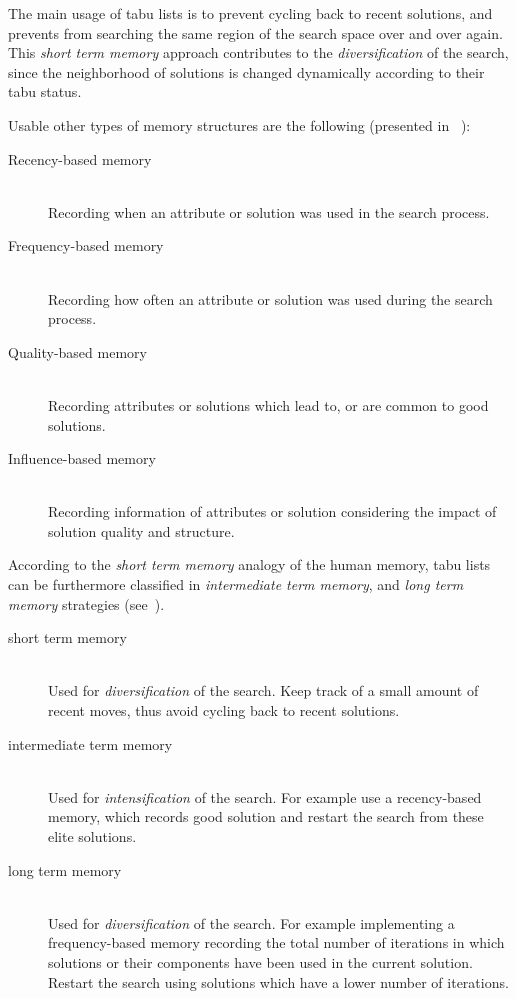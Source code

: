 The main usage of tabu lists is to prevent cycling back to recent solutions, and prevents from searching the same region of the search space over and over again. 
This \emph{short term memory} approach contributes to the \emph{diversification} of the search, since the neighborhood of solutions is changed dynamically according to their tabu status. 

Usable other types of memory structures are the following (presented in ~\cite{glover1997tabu}):  
\begin{description}
\item[Recency-based memory]\hfill \\
Recording when an attribute or solution was used in the search process.
\item[Frequency-based memory]\hfill \\
Recording how often an attribute or solution was used during the search process. 
\item[Quality-based memory]\hfill \\
Recording attributes or solutions which lead to, or are common to good solutions.
\item[Influence-based memory]\hfill \\
Recording information of attributes or solution considering the impact of solution quality and structure.
\end{description}

According to the \emph{short term memory} analogy of the human memory, tabu lists can be furthermore classified in \emph{intermediate term memory}, and \emph{long term memory} strategies (see~\cite{gendreau2003tabusearch}).
\begin{description}
\item[short term memory]\hfill \\
Used for \emph{diversification} of the search. Keep track of a small amount of recent moves, thus avoid cycling back to recent solutions. 
\item[intermediate term memory]\hfill \\
Used for \emph{intensification} of the search. For example use a recency-based memory, which records good solution and restart the search from these elite solutions.
\item[long term memory]\hfill \\
Used for \emph{diversification} of the search. For example implementing a frequency-based memory recording the total number of iterations in which solutions or their components have been used in the current solution. Restart the search using solutions which have a lower number of iterations.
\end{description}

